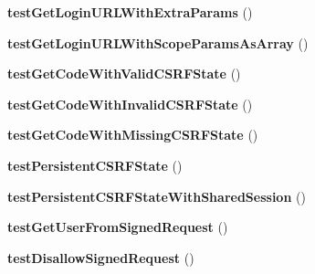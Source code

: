 \begin{DoxyCompactItemize}
\item 
\hypertarget{class_p_h_p_s_d_k_test_case_a25cc48edaee97a7f69b5e8a256e138cd}{{\bfseries test\-Get\-Login\-U\-R\-L\-With\-Extra\-Params} ()}\label{class_p_h_p_s_d_k_test_case_a25cc48edaee97a7f69b5e8a256e138cd}

\item 
\hypertarget{class_p_h_p_s_d_k_test_case_a1b596a2dbc71f3a442b53fef62fb53d7}{{\bfseries test\-Get\-Login\-U\-R\-L\-With\-Scope\-Params\-As\-Array} ()}\label{class_p_h_p_s_d_k_test_case_a1b596a2dbc71f3a442b53fef62fb53d7}

\item 
\hypertarget{class_p_h_p_s_d_k_test_case_a297f4447c73db277fd8ee74ec8678df6}{{\bfseries test\-Get\-Code\-With\-Valid\-C\-S\-R\-F\-State} ()}\label{class_p_h_p_s_d_k_test_case_a297f4447c73db277fd8ee74ec8678df6}

\item 
\hypertarget{class_p_h_p_s_d_k_test_case_a0367a0ec612dee2fe32c819f0b871a7a}{{\bfseries test\-Get\-Code\-With\-Invalid\-C\-S\-R\-F\-State} ()}\label{class_p_h_p_s_d_k_test_case_a0367a0ec612dee2fe32c819f0b871a7a}

\item 
\hypertarget{class_p_h_p_s_d_k_test_case_a3771ba83b0eda3f8d4044e3627f62cc4}{{\bfseries test\-Get\-Code\-With\-Missing\-C\-S\-R\-F\-State} ()}\label{class_p_h_p_s_d_k_test_case_a3771ba83b0eda3f8d4044e3627f62cc4}

\item 
\hypertarget{class_p_h_p_s_d_k_test_case_aab6a637b77fab503c2e4db539fd4ead6}{{\bfseries test\-Persistent\-C\-S\-R\-F\-State} ()}\label{class_p_h_p_s_d_k_test_case_aab6a637b77fab503c2e4db539fd4ead6}

\item 
\hypertarget{class_p_h_p_s_d_k_test_case_acce42ae83f4f38821b478e520c22bde0}{{\bfseries test\-Persistent\-C\-S\-R\-F\-State\-With\-Shared\-Session} ()}\label{class_p_h_p_s_d_k_test_case_acce42ae83f4f38821b478e520c22bde0}

\item 
\hypertarget{class_p_h_p_s_d_k_test_case_a08d866904eab93b54594b44510199e72}{{\bfseries test\-Get\-User\-From\-Signed\-Request} ()}\label{class_p_h_p_s_d_k_test_case_a08d866904eab93b54594b44510199e72}

\item 
\hypertarget{class_p_h_p_s_d_k_test_case_a4e851119a300b777d8b59cd2a0430e0d}{{\bfseries test\-Disallow\-Signed\-Request} ()}\label{class_p_h_p_s_d_k_test_case_a4e851119a300b777d8b59cd2a0430e0d}


\end{DoxyCompactItemize}
